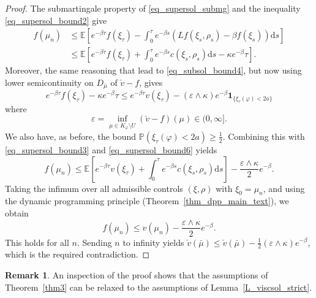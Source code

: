 \documentclass{article}
\theoremstyle{definition}
\newtheorem{remark}[theorem]{\textbf{Remark}}
\numberwithin{equation}{section}
\numberwithin{theorem}{section}
\newcommand{\E}{\mathbb{E}}
\renewcommand{\P}{\mathbb{P}}
\newcommand{\ds}{\mathrm{d}s}
\renewcommand{\P}{{\mathbb P}}
\begin{document}
\begin{proof}
The submartingale property of \eqref{eq_supersol_submg} and the inequality \eqref{eq_supersol_bound2} give
\begin{equation}\label{eq_supersol_bound3}
\begin{aligned}
f(\mu_n) &\le \E\left[ e^{-\beta \tau} f(\xi_{\tau})  - \int_0^{\tau} e^{-\beta s} ( Lf(\xi_s,\rho_s) - \beta f(\xi_s)) \ds \right] \\
&\le \E\left[  e^{-\beta \tau} f(\xi_\tau) + \int_0^\tau e^{-\beta s} c(\xi_s,\rho_s) \ds - \kappa e^{-\beta} \tau \right].
\end{aligned}
\end{equation}
Moreover, the same reasoning that lead to \eqref{eq_subsol_bound4}, but now using lower semicontinuity on $D_{\bar\mu}$ of $\check v-f$, gives
\begin{equation}\label{eq_supersol_bound6}
e^{-\beta \tau}f(\xi_\tau) - \kappa e^{-\beta} \tau \le e^{-\beta \tau} v(\xi_\tau) - (\varepsilon\wedge\kappa)e^{-\beta}\bm1_{\{\xi_\tau(\varphi) < 2a\}}
\end{equation}
where
\[
\varepsilon = \inf_{\mu\in K_\varphi\setminus U} (\check v-f)(\mu) \in (0,\infty].
\]
We also have, as before, the bound $\P(\xi_\tau(\varphi) < 2a)\ge\frac12$. Combining this with \eqref{eq_supersol_bound3} and \eqref{eq_supersol_bound6} yields
\[
f(\mu_n) \le \E\left[ e^{-\beta \tau} v(\xi_\tau) + \int_0^\tau e^{-\beta s} c(\xi_s,\rho_s) \ds \right] - \frac{\varepsilon\wedge\kappa}{2}e^{-\beta}.
\]
Taking the infimum over all admissible controls $(\xi,\rho)$ with $\xi_0=\mu_n$, and using the dynamic programming principle (Theorem~\ref{thm_dpp_main_text}), we obtain
\[
f(\mu_n) \le v(\mu_n) - \frac{\varepsilon\wedge\kappa}{2}e^{-\beta}.
\]
This holds for all $n$. Sending $n$ to infinity yields $\check v(\bar\mu)\le \check v(\bar\mu) - \frac12(\varepsilon \wedge \kappa)e^{-\beta}$, which is the required contradiction.
\end{proof}

\begin{remark}
An inspection of the proof shows that the assumptions of Theorem~\ref{thm3} can be relaxed to the assumptions of    Lemma~\ref{L_viscsol_strict}.
\end{remark}
\end{document}
